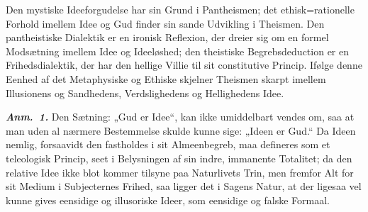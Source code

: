 \documentclass[12pt]{book}
\newcommand{\anm}[1]{\emph{\textbf{Anm.~#1.}}}
\begin{document}
Den mystiske Ideeforgudelse har sin Grund i Pantheismen; det ethisk=rationelle Forhold
imellem Idee og Gud finder sin sande Udvikling i Theismen. Den pantheistiske Dialektik
er en ironisk Reflexion, der dreier sig om en formel Modsætning imellem Idee og
Ideeløshed; den theistiske Begrebsdeduction er en Frihedsdialektik, der har den hellige
Villie til sit constitutive Princip. Ifølge denne Eenhed af det Metaphysiske og Ethiske
skjelner Theismen skarpt imellem Illusionens og Sandhedens, Verdslighedens og
Hellighedens Idee.

\anm{1} Den Sætning: „Gud er Idee“, kan ikke umiddelbart vendes om, saa at man uden al
nærmere Bestemmelse skulde kunne sige: „Ideen er Gud.“ Da Ideen nemlig, forsaavidt den
fastholdes i sit Almeenbegreb, maa defineres som et teleologisk Princip, seet i
Belysningen af sin indre, immanente Totalitet; da den relative Idee ikke blot kommer
tilsyne paa Naturlivets Trin, men fremfor Alt for sit Medium i Subjecternes Frihed, saa
ligger det i Sagens Natur, at der ligesaa vel kunne gives eensidige og illusoriske
Ideer, som eensidige og falske Formaal.
\end{document}
